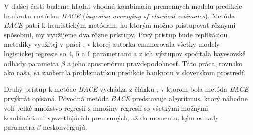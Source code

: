 V ďalšej časti budeme hľadať vhodnú kombináciu premenných modelu predikcie bankrotu metódou \emph{BACE} (\emph{bayesian averaging of classical estimates}).
Metóda \emph{BACE} patrí k heuristickým metódam, ku ktorým možno pristupovať rôznymi spôsobmi, my využijeme dva rôzne prístupy.
Prvý prístup bude replikáciou metodiky využitej v práci \cite{ondrusekova}, v ktorej autorka enumerovala všetky modely logistickej regresie so \(4\), \(5\) a \(6\) parametrami
a z ich výstupov spočítala bayesovské odhady parametra \(\beta\) a jeho aposteriórnu pravdepodobnosť.
Táto práca, rovnako ako naša, sa zaoberala problematikou predikcie bankrotu v slovenskom prostredí.

Druhý prístup k metóde \emph{BACE} vychádza z článku \cite{sala-i-martin}, v ktorom bola metóda \emph{BACE} prvýkrát opísaná.
Pôvodná metóda \emph{BACE} predstavuje algoritmus, ktorý náhodne volí veľké množstvo regresií z množiny regresií so všetkými možnými kombináciami vysvetľujúcich premenných,
až do momentu, kým odhady parametra \(\beta\) neskonvergujú.